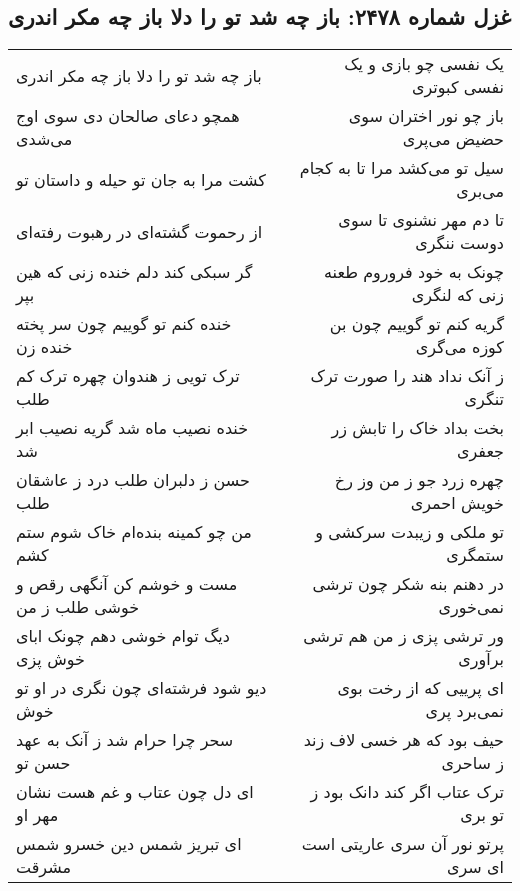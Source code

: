 \begin{center}
\section*{غزل شماره ۲۴۷۸: باز چه شد تو را دلا باز چه مکر اندری}
\label{sec:2478}
\begin{longtable}{l p{0.5cm} r}
باز چه شد تو را دلا باز چه مکر اندری
&&
یک نفسی چو بازی و یک نفسی کبوتری
\\
همچو دعای صالحان دی سوی اوج می‌شدی
&&
باز چو نور اختران سوی حضیض می‌پری
\\
کشت مرا به جان تو حیله و داستان تو
&&
سیل تو می‌کشد مرا تا به کجام می‌بری
\\
از رحموت گشته‌ای در رهبوت رفته‌ای
&&
تا دم مهر نشنوی تا سوی دوست ننگری
\\
گر سبکی کند دلم خنده زنی که هین بپر
&&
چونک به خود فروروم طعنه زنی که لنگری
\\
خنده کنم تو گوییم چون سر پخته خنده زن
&&
گریه کنم تو گوییم چون بن کوزه می‌گری
\\
ترک تویی ز هندوان چهره ترک کم طلب
&&
ز آنک نداد هند را صورت ترک تنگری
\\
خنده نصیب ماه شد گریه نصیب ابر شد
&&
بخت بداد خاک را تابش زر جعفری
\\
حسن ز دلبران طلب درد ز عاشقان طلب
&&
چهره زرد جو ز من وز رخ خویش احمری
\\
من چو کمینه بنده‌ام خاک شوم ستم کشم
&&
تو ملکی و زیبدت سرکشی و ستمگری
\\
مست و خوشم کن آنگهی رقص و خوشی طلب ز من
&&
در دهنم بنه شکر چون ترشی نمی‌خوری
\\
دیگ توام خوشی دهم چونک ابای خوش پزی
&&
ور ترشی پزی ز من هم ترشی برآوری
\\
دیو شود فرشته‌ای چون نگری در او تو خوش
&&
ای پرییی که از رخت بوی نمی‌برد پری
\\
سحر چرا حرام شد ز آنک به عهد حسن تو
&&
حیف بود که هر خسی لاف زند ز ساحری
\\
ای دل چون عتاب و غم هست نشان مهر او
&&
ترک عتاب اگر کند دانک بود ز تو بری
\\
ای تبریز شمس دین خسرو شمس مشرقت
&&
پرتو نور آن سری عاریتی است ای سری
\\
\end{longtable}
\end{center}

